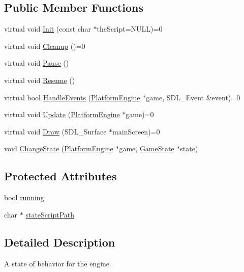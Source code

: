 \subsection*{Public Member Functions}
\begin{CompactItemize}
\item 
virtual void \hyperlink{class_game_state_488fd39ceb2907b13e11f03607f16e5f}{Init} (const char $\ast$theScript=NULL)=0
\item 
virtual void \hyperlink{class_game_state_041e7a5430d71da84745af11abdacd93}{Cleanup} ()=0
\item 
virtual void \hyperlink{class_game_state_0c47c6969a4e0bb32d6cdf7bf9376817}{Pause} ()
\item 
virtual void \hyperlink{class_game_state_d12ece3c3fb066281b73b07a315f04e8}{Resume} ()
\item 
virtual bool \hyperlink{class_game_state_de7bd9bda91253614322ca0ea77b7a14}{HandleEvents} (\hyperlink{class_platform_engine}{PlatformEngine} $\ast$game, SDL\_\-Event \&event)=0
\item 
virtual void \hyperlink{class_game_state_100ca49bc95afce1d5c5b756708bbc2b}{Update} (\hyperlink{class_platform_engine}{PlatformEngine} $\ast$game)=0
\item 
virtual void \hyperlink{class_game_state_1b93233932defca939eed4c0676a5d2a}{Draw} (SDL\_\-Surface $\ast$mainScreen)=0
\item 
void \hyperlink{class_game_state_f786aeb704a22a135dc289bb89fcc452}{ChangeState} (\hyperlink{class_platform_engine}{PlatformEngine} $\ast$game, \hyperlink{class_game_state}{GameState} $\ast$state)
\end{CompactItemize}
\subsection*{Protected Attributes}
\begin{CompactItemize}
\item 
bool \hyperlink{class_game_state_391df04a740c7480270d3c71a578b43a}{running}
\item 
char $\ast$ \hyperlink{class_game_state_bfe09abe78dd5794426964d3392b2973}{stateScriptPath}
\end{CompactItemize}


\subsection{Detailed Description}
A state of behavior for the engine. 

